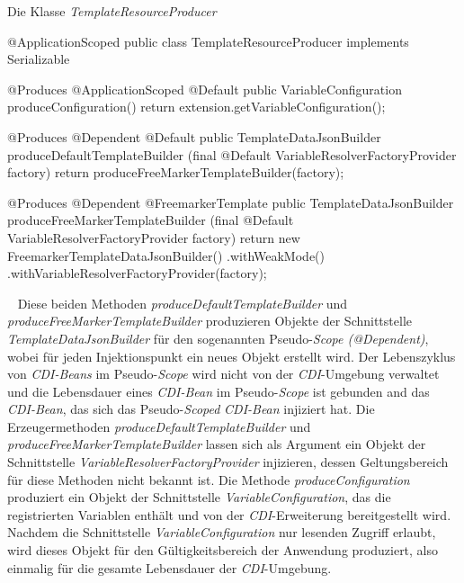 \begin{program}[h]
\caption{Die Klasse \emph{TemplateResourceProducer}}
\label{prog:templateResourceProducer}
\begin{JavaCode}
@ApplicationScoped
public class TemplateResourceProducer implements Serializable {
    @Produces
    @ApplicationScoped
    @Default
    public VariableConfiguration produceConfiguration() {
        return extension.getVariableConfiguration();
    }
    
    @Produces
    @Dependent
    @Default
    public TemplateDataJsonBuilder produceDefaultTemplateBuilder
          (final @Default VariableResolverFactoryProvider factory) {
        return produceFreeMarkerTemplateBuilder(factory);
    }

    @Produces
    @Dependent
    @FreemarkerTemplate
    public TemplateDataJsonBuilder produceFreeMarkerTemplateBuilder
           (final @Default VariableResolverFactoryProvider factory) {
        return new FreemarkerTemplateDataJsonBuilder()
                      .withWeakMode()
                      .withVariableResolverFactoryProvider(factory);
    }
}
\end{JavaCode}
\end{program}
\ \newline
Diese beiden Methoden \emph{produceDefaultTemplateBuilder} und \emph{produceFreeMarkerTemplateBuilder} produzieren Objekte der Schnittstelle \emph{TemplateDataJsonBuilder} für den sogenannten Pseudo-\emph{Scope (@Dependent)}, wobei für jeden Injektionspunkt ein neues Objekt erstellt wird. Der Lebenszyklus von \emph{CDI-Beans} im Pseudo-\emph{Scope} wird nicht von der \emph{CDI}-Umgebung verwaltet und die Lebensdauer eines \emph{CDI-Bean} im Pseudo-\emph{Scope} ist gebunden and das \emph{CDI-Bean}, das sich das Pseudo-\emph{Scoped} \emph{CDI-Bean} injiziert hat. Die Erzeugermethoden \emph{produceDefaultTemplateBuilder} und \emph{produceFreeMarkerTemplateBuilder} lassen sich als Argument ein Objekt der Schnittstelle \emph{VariableResolverFactoryProvider} injizieren, dessen Geltungsbereich für diese Methoden nicht bekannt ist.
\newline
\newline
Die Methode \emph{produceConfiguration} produziert ein Objekt der Schnittstelle  \emph{VariableConfiguration}, das die registrierten Variablen enthält und von der \emph{CDI}-Erweiterung bereitgestellt wird. Nachdem die Schnittstelle  \emph{VariableConfiguration} nur lesenden Zugriff erlaubt, wird dieses Objekt für den Gültigkeitsbereich der Anwendung produziert, also einmalig für die gesamte Lebensdauer der \emph{CDI}-Umgebung.
